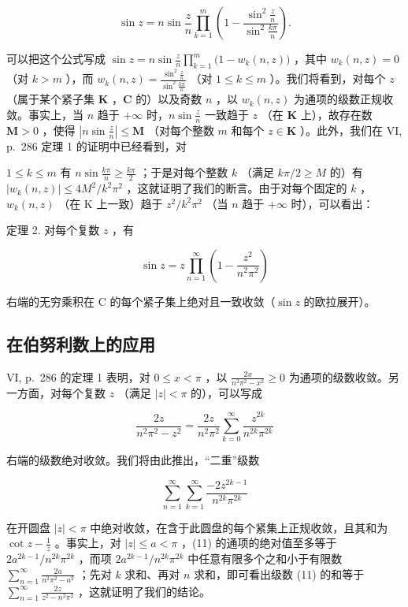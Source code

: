 \[
\sin z = n \sin \frac {z}{n} \prod_ {k = 1} ^ {m} \left(1 - \frac {\sin^ {2} \frac {z}{n}}{\sin^ {2} \frac {k \pi}{n}}\right).\tag{9}
\]

可以把这个公式写成 \(\sin z = n\sin \frac{z}{n}\prod_{k = 1}^{m}\big(1 - w_k(n,z)\big)\) ，其中 \(w_{k}(n,z) = 0\) （对 \(k > m\) ），而 \(w_{k}(n,z) = \frac{\sin^{2}\frac{z}{n}}{\sin^{2}\frac{k\pi}{n}}\) （对 \(1\leqslant k\leqslant m\) ）。我们将看到，对每个 \(z\) （属于某个紧子集 \(\mathbf{K}\) ，\(\mathbf{C}\) 的）以及奇数 \(n\) ，以 \(w_{k}(n,z)\) 为通项的级数正规收敛。事实上，当 \(n\) 趋于 \(+\infty\) 时，\(n\sin \frac{z}{n}\) 一致趋于 \(z\) （在 \(\mathbf{K}\) 上），故存在数 \(\mathbf{M} > 0\) ，使得 \(\left|n\sin \frac{z}{n}\right|\leqslant \mathbf{M}\) （对每个整数 \(m\) 和每个 \(z\in \mathbf{K}\) ）。此外，我们在 VI, p.~286 定理 1 的证明中已经看到，对

\(1 \leqslant k \leqslant m\) 有 \(n \sin \frac{k\pi}{n} \geqslant \frac{k\pi}{2}\) ；于是对每个整数 \(k\) （满足 \(k\pi/2 \geqslant M\) 的）有 \(|w_k(n, z)| \leqslant 4M^2/k^2\pi^2\) ，这就证明了我们的断言。由于对每个固定的 \(k\) ，\(w_k(n, z)\) （在 K 上一致）趋于 \(z^2/k^2\pi^2\) （当 \(n\) 趋于 \(+\infty\) 时），可以看出：

定理 2. 对每个复数 \(z\) ，有

\[
\sin z = z \prod_ {n = 1} ^ {\infty} \left(1 - \frac {z ^ {2}}{n ^ {2} \pi^ {2}}\right)\tag{10}
\]

右端的无穷乘积在 C 的每个紧子集上绝对且一致收敛（\(\sin z\) 的欧拉展开）。

\subsection{在伯努利数上的应用}

VI, p.~286 的定理 1 表明，对 \(0 \leqslant x < \pi\) ，以 \(\frac{2x}{n^2\pi^2 - x^2} \geqslant 0\) 为通项的级数收敛。另一方面，对每个复数 \(z\) （满足 \(|z| < \pi\) 的），可以写成

\[
{\frac {2 z}{n ^ {2} \pi^ {2} - z ^ {2}}} = {\frac {2 z}{n ^ {2} \pi^ {2}}} \sum_ {k = 0} ^ {\infty} {\frac {z ^ {2 k}}{n ^ {2 k} \pi^ {2 k}}}
\]

右端的级数绝对收敛。我们将由此推出，“二重”级数

\[
\sum_ {n = 1} ^ {\infty} \sum_ {k = 1} ^ {\infty} \frac {- 2 z ^ {2 k - 1}}{n ^ {2 k} \pi^ {2 k}}\tag{11}
\]

在开圆盘 \(|z| < \pi\) 中绝对收敛，在含于此圆盘的每个紧集上正规收敛，且其和为 \(\cot z - \frac{1}{z}\) 。事实上，对 \(|z| \leqslant a < \pi\) ，(11) 的通项的绝对值至多等于 \(2a^{2k-1}/n^{2k}\pi^{2k}\) ，而项 \(2a^{2k-1}/n^{2k}\pi^{2k}\) 中任意有限多个之和小于有限数 \(\sum_{n=1}^{\infty} \frac{2a}{n^2\pi^2 - a^2}\) ；先对 \(k\) 求和、再对 \(n\) 求和，即可看出级数 (11) 的和等于 \(\sum_{n=1}^{\infty} \frac{2z}{z^2 - n^2\pi^2}\) ，这就证明了我们的结论。

